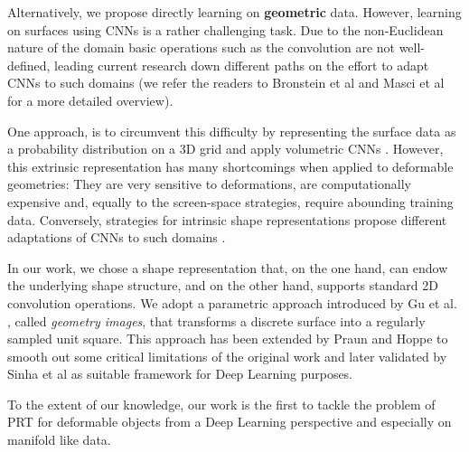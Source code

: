 Alternatively, we propose directly learning on \textbf{geometric} data. However, learning on surfaces using CNNs is a rather challenging task. Due to the non-Euclidean nature of the domain basic operations such as the convolution are not well-defined, leading current research down different paths on the effort to adapt CNNs to such domains (we refer the readers to Bronstein et al  and Masci et al  for a more detailed overview).

One approach, is to circumvent this difficulty by representing the surface data as a probability distribution on a  3D grid and apply volumetric CNNs \cite{3d_ShapeNets}. However, this extrinsic representation has many shortcomings when applied to deformable geometries: They are very sensitive to deformations, are computationally expensive and, equally to the screen-space strategies, require abounding training data. Conversely, strategies for intrinsic shape representations propose different adaptations of CNNs to such domains \cite{ShapeNet1, BoscainiMRB16, CNN_on_Torus}.

In our work, we chose a shape representation that, on the one hand, can endow the underlying shape structure, and on the other hand, supports standard 2D convolution operations. We adopt a parametric approach introduced by Gu et al. , called \textit{geometry images}, that transforms a discrete surface into a regularly sampled unit square. This approach has been extended by Praun and Hoppe  to smooth out some critical limitations of the original work and later validated by Sinha et al  as suitable framework for Deep Learning purposes.

To the extent of our knowledge, our work is the first to tackle the problem of PRT for deformable objects from a Deep Learning perspective and especially on manifold like data. 


